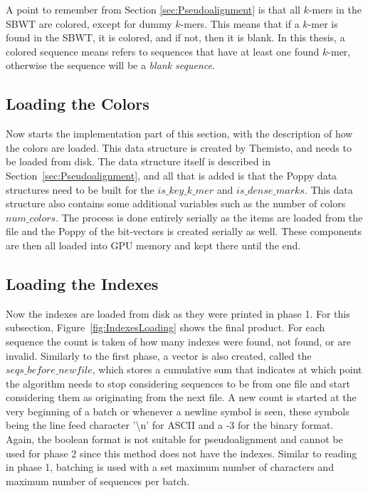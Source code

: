 A point to remember from Section \ref{sec:Pseudoalignment} is that all $k$-mers in the SBWT are colored, except for dummy $k$-mers.
This means that if a $k$-mer is found in the SBWT, it is colored, and if not, then it is blank.
In this thesis, a colored sequence means refers to sequences that have at least one found $k$-mer, otherwise the sequence will be a \textit{blank sequence}.

\subsection{Loading the Colors}

Now starts the implementation part of this section, with the description of how the colors are loaded.
This data structure is created by Themisto, and needs to be loaded from disk.
The data structure itself is described in Section~\ref{sec:Pseudoalignment}, and all that is added is that the Poppy data structures need to be built for the $\mathit{is\_key\_k\_mer}$ and $\mathit{is\_dense\_marks}$.
This data structure also contains some additional variables such as the number of colors $\mathit{num\_colors}$.
The process is done entirely serially as the items are loaded from the file and the Poppy of the bit-vectors is created serially as well.
These components are then all loaded into GPU memory and kept there until the end.

\subsection{Loading the Indexes}\label{subs:IndexesLoading}

Now the indexes are loaded from disk as they were printed in phase 1.
For this subsection, Figure~\ref{fig:IndexesLoading} shows the final product.
For each sequence the count is taken of how many indexes were found, not found, or are invalid.
Similarly to the first phase, a vector is also created, called the $\mathit{seqs\_before\_newfile}$, which stores a cumulative sum that indicates at which point the algorithm needs to stop considering sequences to be from one file and start considering them as originating from the next file.
A new count is started at the very beginning of a batch or whenever a newline symbol is seen, these symbols being the line feed character '\textbackslash n' for ASCII and a -3 for the binary format.
Again, the boolean format is not suitable for pseudoalignment and cannot be used for phase 2 since this method does not have the indexes.
Similar to reading in phase 1, batching is used with a set maximum number of characters and maximum number of sequences per batch.

